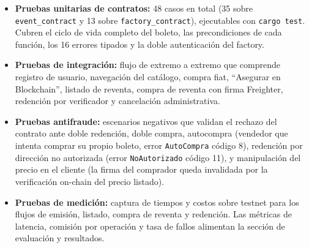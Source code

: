 \begin{itemize}
    \item \textbf{Pruebas unitarias de contratos:} 48 casos en total (35 sobre \texttt{event\_contract} y 13 sobre \texttt{factory\_contract}), ejecutables con \texttt{cargo test}. Cubren el ciclo de vida completo del boleto, las precondiciones de cada función, los 16 errores tipados y la doble autenticación del factory.
    \item \textbf{Pruebas de integración:} flujo de extremo a extremo que comprende registro de usuario, navegación del catálogo, compra fiat, ``Asegurar en Blockchain'', listado de reventa, compra de reventa con firma Freighter, redención por verificador y cancelación administrativa.
    \item \textbf{Pruebas antifraude:} escenarios negativos que validan el rechazo del contrato ante doble redención, doble compra, autocompra (vendedor que intenta comprar su propio boleto, error \texttt{AutoCompra} código 8), redención por dirección no autorizada (error \texttt{NoAutorizado} código 11), y manipulación del precio en el cliente (la firma del comprador queda invalidada por la verificación on-chain del precio listado).
    \item \textbf{Pruebas de medición:} captura de tiempos y costos sobre testnet para los flujos de emisión, listado, compra de reventa y redención. Las métricas de latencia, comisión por operación y tasa de fallos alimentan la sección de evaluación y resultados.
\end{itemize}
